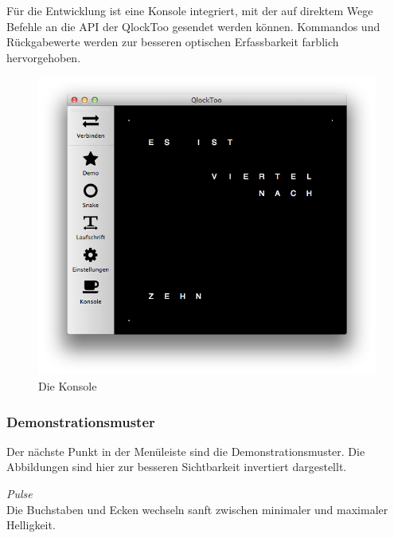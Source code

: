 Für die Entwicklung ist eine Konsole integriert, mit der auf direktem Wege Befehle an die API der QlockToo gesendet werden können. Kommandos und Rückgabewerte werden zur besseren optischen Erfassbarkeit farblich hervorgehoben.
%
\begin{figure}[h]
    \centering
    \includegraphics[width=\columnwidth,draft]{Abbildungen/Manager}
    \caption[Konsole]{Die Konsole}
    \label{fig:Konsole}
\end{figure}
%

\subsubsection{Demonstrationsmuster}
Der nächste Punkt in der Menüleiste sind die Demonstrationsmuster.
Die Abbildungen sind hier zur besseren Sichtbarkeit invertiert dargestellt.

\emph{Pulse} \\
Die Buchstaben und Ecken wechseln sanft zwischen minimaler und maximaler Helligkeit.

